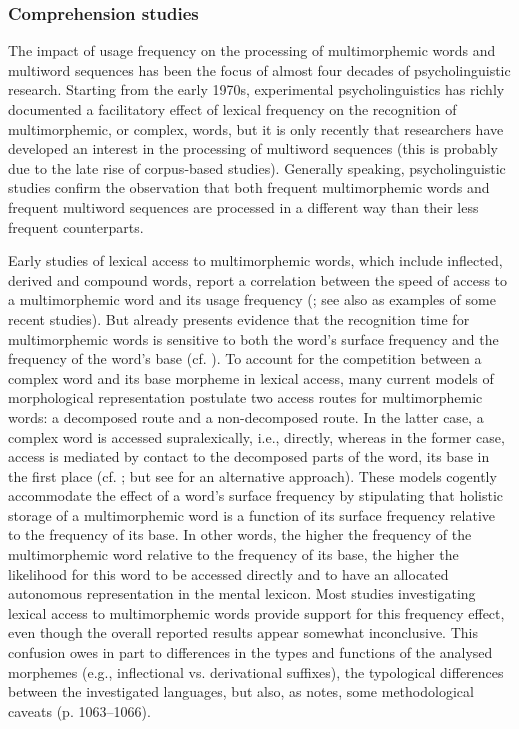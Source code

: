 \subsubsection{Comprehension studies}
The impact of usage frequency on the processing of multimorphemic words and multiword sequences has been the focus of almost four decades of psycholinguistic research. Starting from the early 1970s, experimental psycholinguistics has richly documented a facilitatory effect of lexical frequency on the recognition of multimorphemic, or complex, words, but it is only recently that researchers have developed an interest in the processing of multiword sequences (this is probably due to the late rise of corpus-based studies). Generally speaking, psycholinguistic studies confirm the observation that both frequent multimorphemic words and frequent multiword sequences are processed in a different way than their less frequent counterparts. 

Early studies of lexical access to multimorphemic words, which include inflected, derived and compound words, report a correlation between the speed of access to a multimorphemic word and its usage frequency (\citealt{morton-1969, taft-forster-1976, bradley-1979, stemberger-macwhinney-1986}; see also \citealt{giraudo-grainger, janssen-bi-caramazza} as examples of some recent studies). But already \citet{taft-1979} presents evidence that the recognition time for multimorphemic words is sensitive to both the word's surface frequency and the frequency of the word's base (cf. \citealt{burani-caramazza-1987,cole-etal-1989,alegre-gordon-1999,meunier-segui}). To account for the competition between a complex word and its base morpheme in lexical access, many current models of morphological representation postulate two access routes for multimorphemic words: a decomposed route and a non-decomposed route. In the latter case, a complex word is accessed supralexically, i.e., directly, whereas in the former case, access is mediated by contact to the decomposed parts of the word, its base in the first place (cf. \citealt{caramazza-etal-1988,baayen-1992,frauenfelder-schreuder-1992,baayen-schreuder-1999,hay-2001,blumenthal}; but see \citealt{bien-baayen-levelt} for an alternative approach). These models cogently accommodate the effect of a word's surface frequency by stipulating that holistic storage of a multimorphemic word is a function of its surface frequency relative to the frequency of its base. In other words, the higher the frequency of the multimorphemic word relative to the frequency of its base, the higher the likelihood for this word to be accessed directly and to have an allocated autonomous representation in the mental lexicon. Most studies investigating lexical access to multimorphemic words provide support for this frequency effect, even though the overall reported results appear somewhat inconclusive. This confusion owes in part to differences in the types and functions of the analysed morphemes (e.g., inflectional vs. derivational suffixes), the typological differences between the investigated languages, but also, as \citet{hay-2001} notes, some methodological caveats (p. 1063--1066). 

